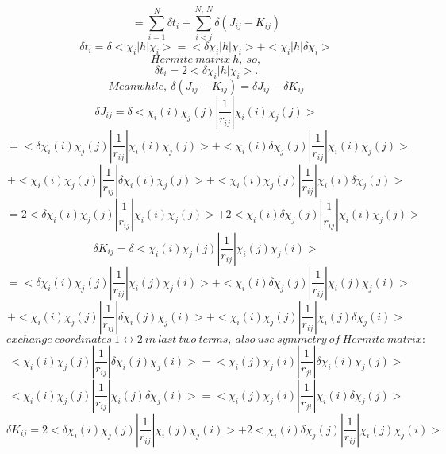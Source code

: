 $$
=\sum_{i=1}^N{\delta t_i}+\sum_{i<j}^{N,\ N}{\delta \left( J_{ij}-K_{ij} \right)}
$$
$$
\delta t_i=\delta <\chi _i|h|\chi _i>=<\delta \chi _i|h|\chi _i>+<\chi _i|h|\delta \chi _i>
$$
$$
Hermite\ matrix\ h,\ so,
$$
$$
\delta t_i=2<\delta \chi _i|h|\chi _i>.
$$
$$
Meanwhile,\ \delta \left( J_{ij}-K_{ij} \right) =\delta J_{ij}-\delta K_{ij}
$$
$$
\delta J_{ij}=\delta <\chi _i\left( i \right) \chi _j\left( j \right) |\frac{1}{r_{ij}}|\chi _i\left( i \right) \chi _j\left( j \right) >
$$
$$
=<\delta \chi _i\left( i \right) \chi _j\left( j \right) |\frac{1}{r_{ij}}|\chi _i\left( i \right) \chi _j\left( j \right) >+<\chi _i\left( i \right) \delta \chi _j\left( j \right) |\frac{1}{r_{ij}}|\chi _i\left( i \right) \chi _j\left( j \right) >
$$
$$
+<\chi _i\left( i \right) \chi _j\left( j \right) |\frac{1}{r_{ij}}|\delta \chi _i\left( i \right) \chi _j\left( j \right) >+<\chi _i\left( i \right) \chi _j\left( j \right) |\frac{1}{r_{ij}}|\chi _i\left( i \right) \delta \chi _j\left( j \right) >
$$
$$
=2<\delta \chi _i\left( i \right) \chi _j\left( j \right) |\frac{1}{r_{ij}}|\chi _i\left( i \right) \chi _j\left( j \right) >+2<\chi _i\left( i \right) \delta \chi _j\left( j \right) |\frac{1}{r_{ij}}|\chi _i\left( i \right) \chi _j\left( j \right) >
$$
$$
\delta K_{ij}=\delta <\chi _i\left( i \right) \chi _j\left( j \right) |\frac{1}{r_{ij}}|\chi _i\left( j \right) \chi _j\left( i \right) >
$$
$$
=<\delta \chi _i\left( i \right) \chi _j\left( j \right) |\frac{1}{r_{ij}}|\chi _i\left( j \right) \chi _j\left( i \right) >+<\chi _i\left( i \right) \delta \chi _j\left( j \right) |\frac{1}{r_{ij}}|\chi _i\left( j \right) \chi _j\left( i \right) >
$$
$$
+<\chi _i\left( i \right) \chi _j\left( j \right) |\frac{1}{r_{ij}}|\delta \chi _i\left( j \right) \chi _j\left( i \right) >+<\chi _i\left( i \right) \chi _j\left( j \right) |\frac{1}{r_{ij}}|\chi _i\left( j \right) \delta \chi _j\left( i \right) >
$$
$$
exchange\ coordinates\ 1\leftrightarrow 2\ in\ last\ two\ terms,\ also\ use\ symmetry\ of\ Hermite\ matrix:
$$
$$
<\chi _i\left( i \right) \chi _j\left( j \right) |\frac{1}{r_{ij}}|\delta \chi _i\left( j \right) \chi _j\left( i \right) >=<\chi _i\left( j \right) \chi _j\left( i \right) |\frac{1}{r_{ji}}|\delta \chi _i\left( i \right) \chi _j\left( j \right) >
$$
$$
<\chi _i\left( i \right) \chi _j\left( j \right) |\frac{1}{r_{ij}}|\chi _i\left( j \right) \delta \chi _j\left( i \right) >=<\chi _i\left( j \right) \chi _j\left( i \right) |\frac{1}{r_{ji}}|\chi _i\left( i \right) \delta \chi _j\left( j \right) >
$$
$$
\delta K_{ij}=2<\delta \chi _i\left( i \right) \chi _j\left( j \right) |\frac{1}{r_{ij}}|\chi _i\left( j \right) \chi _j\left( i \right) >+2<\chi _i\left( i \right) \delta \chi _j\left( j \right) |\frac{1}{r_{ij}}|\chi _i\left( j \right) \chi _j\left( i \right) >
$$
